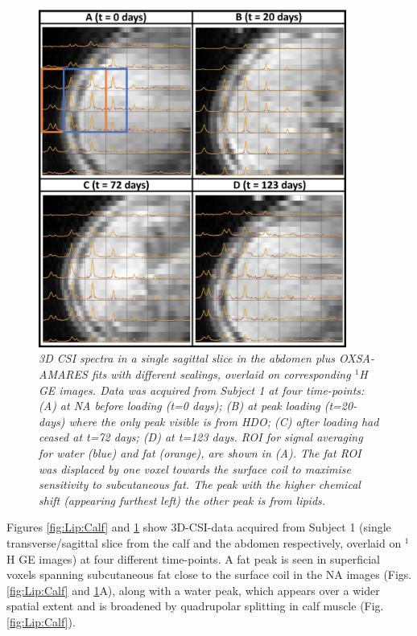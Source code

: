 \begin{figure}
    \centering
    \includegraphics[width=0.9\textwidth]{Figures/Lipid/Abdomen.png}
    \caption{\textit{3D \ac{CSI} spectra in a single sagittal slice in the abdomen plus OXSA-AMARES fits with different scalings, overlaid on corresponding $^1$H \ac{GE} images. Data was acquired from Subject 1 at four time-points: (A) at NA before loading (t=0 days); (B) at peak loading (t=20-days) where the only peak visible is from \ac{HDO}; (C) after loading had ceased at t=72 days; (D) at t=123 days. \ac{ROI} for signal averaging for water (blue) and fat (orange), are shown in (A). The fat \ac{ROI} was displaced by one voxel towards the surface coil to maximise sensitivity to subcutaneous fat. The peak with the higher chemical shift (appearing furthest left) the other peak is from lipids.}}
    \label{fig:Lip:Abdomen}
\end{figure}

Figures \ref{fig:Lip:Calf} and \ref{fig:Lip:Abdomen} show 3D-\ac{CSI}-data acquired from Subject 1 (single transverse/sagittal slice from the calf and the abdomen respectively, overlaid on $^1$H GE images) at four different time-points. A fat peak is seen in superficial voxels spanning subcutaneous fat close to the surface coil in the \ac{NA} images (Figs. \ref{fig:Lip:Calf} and \ref{fig:Lip:Abdomen}A), along with a water peak, which appears over a wider spatial extent and is broadened by quadrupolar splitting in calf muscle (Fig. \ref{fig:Lip:Calf}). 

